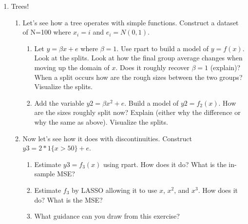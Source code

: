 \documentclass[11pt]{article}
\begin{document}
\begin{enumerate}
\begin{enumerate}
	\end{enumerate}
	\item Trees!
	\begin{enumerate}
		\item Let's see how a tree operates with simple functions.  Construct a dataset of N=100 where $x_i = i$ and $e_i = N(0,1)$.
		\begin{enumerate} 
			\item Let $y=\beta x+e$ where $\beta=1$. Use rpart to build a model of $y=f(x)$. Look at the splits. Look at how the final group average changes when moving up the domain of $x$. Does it roughly recover $\beta=1$ (explain)? When a split occurs how are the rough sizes between the two groups? Visualize the splits.
			\item Add the variable $y2 = \beta x^2+e$. Build a model of $y2=f_2(x)$. How are the sizes roughly split now? Explain (either why the difference or why the same as above). Visualize the splits.
		\end{enumerate}
		\item Now let's see how it does with discontinuities.  Construct $y3 = 2*1\{x>50\}+e$.
		\begin{enumerate}
			\item Estimate $y3=f_3(x)$ using rpart. How does it do? What is the in-sample MSE?
			\item Estimate $f_3$ by LASSO allowing it to use $x$, $x^2$, and $x^3$. How does it do? What is the MSE?
			\item What guidance can you draw from this exercise?
		\end{enumerate}
	\end{enumerate}
\end{enumerate}
\end{document}
